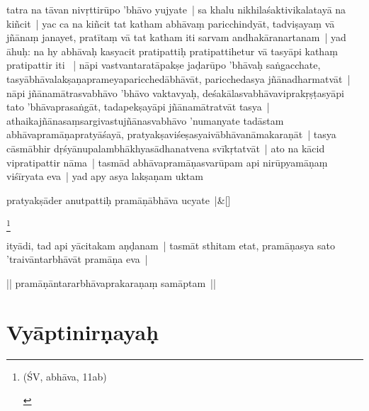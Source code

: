 \documentclass[article,12pt,a4paper]{memoir}%
\newcounter{parCount}
\begin{document}
	  \pstart \leavevmode%
	\label{thakur75-105.5}tatra na tāvan nivṛttirūpo 'bhāvo yujyate | sa khalu nikhilaśaktivikalatayā na kiñcit | yac ca na kiñcit tat katham abhāvaṃ paricchindyāt, tadviṣayaṃ vā jñānaṃ janayet, pratītaṃ vā tat katham iti sarvam andhakāranartanam | yad āhuḥ: na hy abhāvaḥ kasyacit pratipattiḥ pratipattihetur vā tasyāpi kathaṃ pratipattir iti  | nāpi vastvantaratāpakṣe jaḍarūpo 'bhāvaḥ saṅgacchate, tasyābhāvalakṣaṇaprameyaparicchedābhāvāt, paricchedasya jñānadharmatvāt | nāpi jñānamātrasvabhāvo 'bhāvo vaktavyaḥ, deśakālasvabhāvaviprakṛṣṭasyāpi tato 'bhāvaprasaṅgāt, tadapekṣayāpi jñānamātratvāt tasya | athaikajñānasaṃsargivastujñānasvabhāvo 'numanyate tadāstam abhāvapramāṇapratyāśayā, pratyakṣaviśeṣasyaivābhāvanāmakaraṇāt | tasya cāsmābhir dṛśyānupalambhākhyasādhanatvena svīkṛtatvāt | ato na kācid vipratipattir nāma | tasmād abhāvapramāṇasvarūpam api nirūpyamāṇaṃ viśīryata eva | yad apy asya lakṣaṇam uktam
	{}
	\pend%
      
	    
	    \stanza[\smallbreak]
	  pratyakṣāder anutpattiḥ pramāṇābhāva ucyate |\&[\smallbreak]
	  
	  
	  \footnote{\begin{english}(ŚV, abhāva, 11ab)\end{english}}

	  \pstart \leavevmode%
	ityādi, tad api yācitakam aṇḍanam | tasmāt sthitam etat, pramāṇasya sato 'traivāntarbhāvāt pramāṇa eva |
	{}
	\pend%
      

	  \pstart \leavevmode%
	|| pramāṇāntararbhāvaprakaraṇaṃ samāptam || 
	{}
	\pend%
      
	    
	    \endnumbering%
	    \endgroup
	    
	  
	  
	
	    
	    \begingroup
	    \beginnumbering%
	    
	  
\chapter*[{Vyāptinirṇayaḥ}]{Vyāptinirṇayaḥ}\label{Vyāptinirṇayaḥ}
\end{document}
